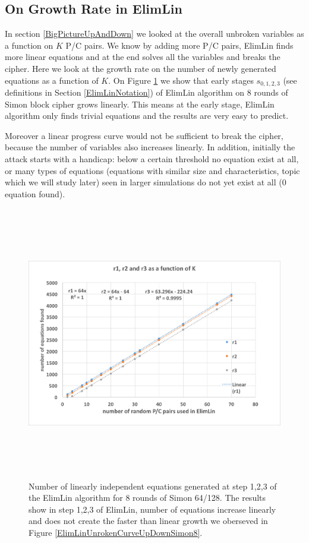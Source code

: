 \subsection{On Growth Rate in ElimLin}
\label{SuperLinearGrowth}
In section \ref{BigPictureUpAndDown} we looked at the overall unbroken variables as a function on $K$ P/C pairs. We know by adding more P/C pairs, ElimLin finds more linear equations and at the end solves all the variables and breaks the cipher. Here we look at the growth rate on the number of newly generated equations as a function of $K$.  On Figure \ref{fig:ElimLinQuadConjExampleSimon8r123} we show that early stages $s_{0,1,2,3}$ (see definitions in Section \ref{ElimLinNotation}) of ElimLin algorithm on 8 rounds of Simon block cipher grows linearly. This means at the early stage, ElimLin algorithm only finds trivial equations and the results are very easy to predict. 

Moreover a linear progress curve would not be sufficient to break the cipher, 
because the number of variables also increases linearly. 
In addition, initially the attack starts with a handicap: below a certain threshold no equation exist at all, or many types of equations (equations with similar size and
characteristics, topic which we will study later) seen in larger simulations do not yet exist at all (0 equation found).

\begin{figure}[!h] 
	\vspace{-0.2cm}
	\centering
	\includegraphics*[width=140mm, height=12cm]{./pics/Test62.png}
	\caption[Number of linearly independent equations generated at step 1,2,3
	of the ElimLin algorithm]{Number of linearly independent equations generated at step 1,2,3
		of the ElimLin algorithm
		for 8 rounds of Simon 64/128. The results show in step 1,2,3 of ElimLin, number of equations increase linearly and does not create the faster than linear growth we oberseved in Figure \ref{ElimLinUnrokenCurveUpDownSimon8}.}
	\label{fig:ElimLinQuadConjExampleSimon8r123}
	\vspace{-0.1cm}
\end{figure}

